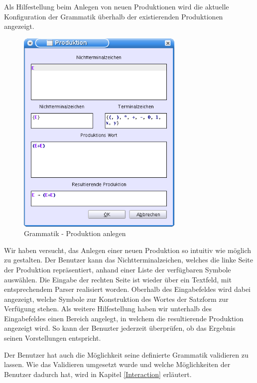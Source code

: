 Als Hilfestellung beim Anlegen von neuen Produktionen wird die aktuelle
Konfiguration der Grammatik überhalb der existierenden Produktionen
angezeigt.\vspace{10pt}

\begin{figure}[h!]
\begin{center}
\includegraphics[width=8cm]{../images/production_dialog.png}
\caption{Grammatik - Produktion anlegen}
\end{center}
\end{figure}
\vspace{10pt}

Wir haben versucht, das Anlegen einer neuen Produktion so intuitiv wie möglich
zu gestalten. Der Benutzer kann das Nichtterminalzeichen, welches die linke
Seite der Produktion repräsentiert, anhand einer Liste der
verfügbaren Symbole auswählen. Die Eingabe der rechten Seite ist
wieder über ein Textfeld, mit entsprechendem Parser realisiert
worden. Oberhalb des Eingabefeldes wird dabei angezeigt, welche Symbole zur
Konstruktion des Wortes der Satzform zur Verfügung stehen. Als weitere
Hilfestellung haben wir unterhalb des Eingabefeldes einen Bereich angelegt,
in welchem die resultierende Produktion angezeigt wird. So kann der
Benuzter jederzeit überprüfen, ob das Ergebnis seinen
Vorstellungen entspricht.\vspace{10pt}

Der Benutzer hat auch die Möglichkeit seine definierte Grammatik validieren zu
lassen. Wie das Validieren umgesetzt wurde und welche Möglichkeiten der
Benutzer dadurch hat, wird in Kapitel \ref{Interaction} erläutert.\vspace{10pt}
